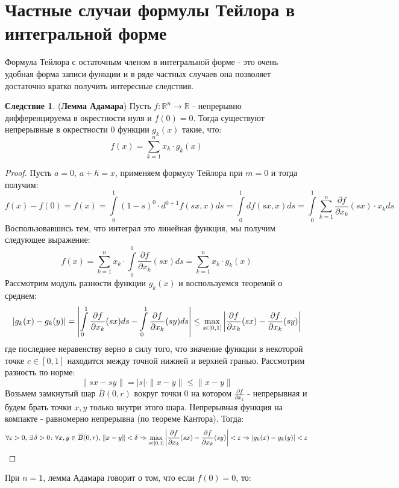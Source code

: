 \documentclass[12pt]{article}
\newcommand{\MR}{\mathbb{R}}
\newcommand{\VE}{\varepsilon}
\theoremstyle{definition}
\newtheorem{corollary}{Следствие}
\newcommand{\ddint}[2]{\displaystyle\int\limits_{#1}^{#2}}
\newcommand{\smallerrel}[1]{\mathrel{\mathpalette\smallerrelaux{#1}}}
\newcommand{\smallerrelaux}[2]{\raisebox{.1ex}{\scalebox{.75}{$#1#2$}}}
\newcommand{\smallin}{\smallerrel{\in}}
\begin{document}
\section*{Частные случаи формулы Тейлора в интегральной форме}
Формула Тейлора с остаточным членом в интегральной форме - это очень удобная форма записи функции и в ряде частных случаев она позволяет достаточно кратко получить интересные следствия.
\begin{corollary}(\textbf{Лемма Адамара})
	Пусть $f \colon \MR^n \to \MR$ - непрерывно дифференцируема в окрестности нуля и $f(0) = 0$. Тогда существуют непрерывные в окрестности $0$ функции $g_k(x)$ такие, что:
	$$
		f(x) = \displaystyle \sum\limits_{k = 1}^n x_k {\cdot} g_k(x)	
	$$
\end{corollary}
\begin{proof}
	Пусть $a = 0, \, a + h = x$, применяем формулу Тейлора при $m = 0$ и тогда получим:
	$$
		f(x) - f(0) = f(x) = \ddint{0}{1}(1-s)^0{\cdot}d^{0+1}f(sx,x)ds = \ddint{0}{1}df(sx,x)ds = \ddint{0}{1}\sum\limits_{k=1}^{n}\dfrac{\partial f}{\partial x_k}(sx){\cdot}x_k ds
	$$
	Воспользовавшись тем, что интеграл это линейная функция, мы получим следующее выражение:
	$$
		f(x) = \sum\limits_{k=1}^n x_k{\cdot}\ddint{0}{1}\dfrac{\partial f}{\partial x_k}(sx) ds = \sum\limits_{k = 1}^{n}x_k{\cdot}g_k(x)
	$$
	Рассмотрим модуль разности функции $g_k(x)$ и воспользуемся теоремой о среднем:
	$$
		|g_k(x) - g_k(y)| = \left|\ddint{0}{1}\dfrac{\partial f}{\partial x_k}(sx) ds  - \ddint{0}{1}\dfrac{\partial f}{\partial x_k}(sy) ds\right| \leq \max\limits_{s \smallin [0,1]}\left| \dfrac{\partial f}{\partial x_k}(sx) - \dfrac{\partial f}{\partial x_k}(sy) \right|
	$$
	где последнее неравенству верно в силу того, что значение функции в некоторой точке $c \in [0,1]$ находится между точной нижней и верхней гранью. Рассмотрим разность по норме:
	$$
		\|sx - sy\| = |s|{\cdot}\|x - y\| \leq \|x - y\|
	$$
	Возьмем замкнутый шар $\overline{B}(0,r)$ вокруг точки $0$ на котором $\tfrac{\partial f}{\partial x_k}$ - непрерывная и будем брать точки $x,y$ только внутри этого шара. Непрерывная функция на компакте - равномерно непрерывна (по теореме Кантора). Тогда: 
	$$
		\forall \VE > 0, \, \exists \, \delta > 0 \colon \forall x,y \in \overline{B}(0,r), \, \|x - y\| < \delta \Rightarrow \max\limits_{s \smallin [0,1]}\left| \dfrac{\partial f}{\partial x_k}(sx) - \dfrac{\partial f}{\partial x_k}(sy) \right| < \VE \Rightarrow |g_k(x) - g_k(y)| < \VE
	$$
\end{proof}
При $n =1$, лемма Адамара говорит о том, что если $f(0) = 0$, то: 
\end{document}

